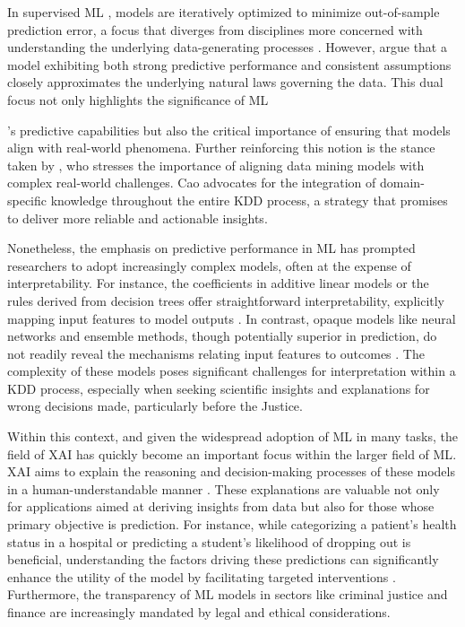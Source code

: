 In supervised \gls{ML} \cite{Vapnik1999AnTheory}, models are iteratively optimized to minimize out-of-sample prediction error, a focus that diverges from disciplines more concerned with understanding the underlying data-generating processes \cite{Mullainathan2017MachineApproach}. However, \cite{Shmueli2010ToPredict, Zhao2021CausalModels} argue that a model exhibiting both strong predictive performance and consistent assumptions closely approximates the underlying natural laws governing the data. This dual focus not only highlights the significance of \gls{ML}

's predictive capabilities but also the critical importance of ensuring that models align with real-world phenomena. Further reinforcing this notion is the stance taken by \cite{Cao2009IntroductionMining}, who stresses the importance of aligning data mining models with complex real-world challenges. Cao advocates for the integration of domain-specific knowledge throughout the entire \gls{KDD} process, a strategy that promises to deliver more reliable and actionable insights.

Nonetheless, the emphasis on predictive performance in \gls{ML} has prompted researchers to adopt increasingly complex models, often at the expense of interpretability. For instance, the coefficients in additive linear models or the rules derived from decision trees offer straightforward interpretability, explicitly mapping input features to model outputs \cite{molnar2019}. In contrast, opaque models like neural networks and ensemble methods, though potentially superior in prediction, do not readily reveal the mechanisms relating input features to outcomes \cite{Linardatos2020ExplainableMethods}. The complexity of these models poses significant challenges for interpretation within a \gls{KDD} process, especially when seeking scientific insights and explanations for wrong decisions made, particularly before the Justice. 

Within this context, and given the widespread adoption of \gls{ML} in many tasks,  the field of \gls{XAI} has quickly become an important focus within the larger field of \gls{ML}. \gls{XAI} aims to explain the reasoning and decision-making processes of these models in a human-understandable manner \cite{Miller2019ExplanationSciences}. These explanations are valuable not only for applications aimed at deriving insights from data but also for those whose primary objective is prediction. For instance, while categorizing a patient's health status in a hospital or predicting a student's likelihood of dropping out is beneficial, understanding the factors driving these predictions can significantly enhance the utility of the model by facilitating targeted interventions \cite{Razavian2015Population-levelFactors, Pellagatti2021GeneralizedDropout, Berens2019EarlyMethods}.  Furthermore, the transparency of \gls{ML} models in sectors like criminal justice \cite{Wang2023InPrediction} and finance \cite{Bussmann2021ExplainableManagement, Chen2023Globally-ConsistentEvaluation} are increasingly mandated by legal and ethical considerations. 






